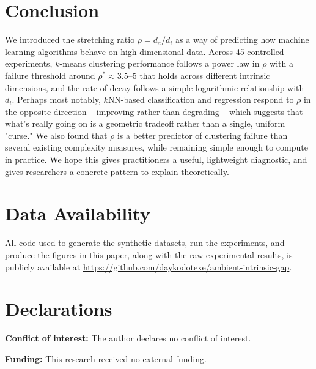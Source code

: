 \documentclass[pdflatex,sn-mathphys-num]{sn-jnl}
\theoremstyle{thmstyleone}
\begin{document}
\section{Conclusion}

We introduced the stretching ratio $\rho = d_a / d_i$ as a way of predicting
how machine learning algorithms behave on high-dimensional data. Across 45
controlled experiments, $k$-means clustering performance follows a power law in
$\rho$ with a failure threshold around $\rho^* \approx 3.5$--$5$ that holds
across different intrinsic dimensions, and the rate of decay follows a simple
logarithmic relationship with $d_i$. Perhaps most notably, $k$NN-based
classification and regression respond to $\rho$ in the opposite direction --
improving rather than degrading -- which suggests that what's really going on
is a geometric tradeoff rather than a single, uniform "curse." We also found
that $\rho$ is a better predictor of clustering failure than several existing
complexity measures, while remaining simple enough to compute in practice. We
hope this gives practitioners a useful, lightweight diagnostic, and gives
researchers a concrete pattern to explain theoretically.

\section*{Data Availability}
All code used to generate the synthetic datasets, run the experiments, and
produce the figures in this paper, along with the raw experimental results, is
publicly available at
\url{https://github.com/daykodotexe/ambient-intrinsic-gap}.

\section*{Declarations}

\noindent\textbf{Conflict of interest:} The author declares no conflict of
interest.

\noindent\textbf{Funding:} This research received no external funding.
\end{document}
